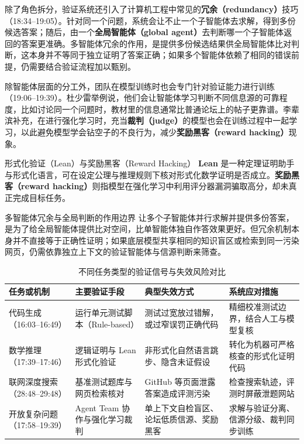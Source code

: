 \documentclass[UTF8,a4paper,11pt,fontset=fandol]{ctexart}
\begin{document}
除了角色拆分，验证系统还引入了计算机工程中常见的\textbf{冗余（redundancy）}技巧（18:34–19:05）。针对同一个问题，系统会让不止一个子智能体去求解，得到多份候选答案；随后，由一个\textbf{全局智能体（global agent）}去判断哪一个子智能体返回的答案更准确。多智能体冗余的作用，是提供多份候选结果供全局智能体比对判断，这本身并不等同于独立证明了答案正确；如果多个智能体依赖了相同的错误前提，仍需要结合验证流程加以甄别。

除智能体层面的分工外，团队在模型训练时也会专门针对验证能力进行训练（19:06–19:39）。杜少雷举例说，他们会让智能体学习判断不同信息源的可靠程度，比如讨论同一个问题时，教材里的信息通常比普通论坛上的帖子更靠谱。李辈滨补充，在进行强化学习时，充当\textbf{裁判（judge）}的模型也会在训练过程中一起学习，以此避免模型学会钻空子的不良行为，减少\textbf{奖励黑客（reward hacking）}现象。

\begin{knowledgebox}{形式化验证（Lean）与奖励黑客（Reward Hacking）}
\textbf{Lean} 是一种定理证明助手与形式化语言，可在设定公理与推理规则下核对形式化数学证明是否成立。\textbf{奖励黑客（reward hacking）}则指模型在强化学习中利用评分器漏洞骗取高分，却未真正完成目标任务。
\end{knowledgebox}
\begin{importantbox}{多智能体冗余与全局判断的作用边界}
让多个子智能体并行求解并提供多份答案，是为了给全局智能体提供比对空间，比单智能体独自作答效果更好。但冗余机制本身并不直接等于正确性证明；如果底层模型共享相同的知识盲区或检索到同一污染网页，仍需依靠独立上下文的验证智能体与信源判断来筛查。
\end{importantbox}
\begin{table}[H]\centering\small
\caption{不同任务类型的验证信号与失效风险对比}
\begin{tabular}{>{\raggedright\arraybackslash}p{\dimexpr(\linewidth-8\tabcolsep)/4\relax}>{\raggedright\arraybackslash}p{\dimexpr(\linewidth-8\tabcolsep)/4\relax}>{\raggedright\arraybackslash}p{\dimexpr(\linewidth-8\tabcolsep)/4\relax}>{\raggedright\arraybackslash}p{\dimexpr(\linewidth-8\tabcolsep)/4\relax}}
\toprule
任务或机制 & 主要验证手段 & 典型失效方式 & 系统应对措施\\\midrule
代码生成（16:03–16:49） & 运行单元测试脚本（Rule-based） & 测试过宽放过错解，或过窄误罚正确代码 & 精细校准测试边界，结合人工与模型复核\\[4pt]
数学推理（17:39–17:46） & 逻辑证明与 Lean 形式化验证 & 非形式化自然语言跳步、隐含未证假设 & 转化为机器可严格核查的形式化证明代码\\[4pt]
联网深度搜索（28:48–29:48） & 基准测试题库与网页检索核对 & GitHub 等页面泄露答案造成评测污染 & 检查搜索轨迹，评测时屏蔽泄题网站\\[4pt]
开放复杂问题（17:58–19:39） & Agent Team 协作与强化学习裁判 & 单上下文自检盲区、论坛低质信源、奖励黑客 & 求解与验证分离、信源分级、裁判同步训练\\[4pt]
\bottomrule\end{tabular}\end{table}
\end{document}
